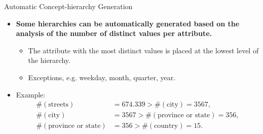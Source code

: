 \begin{frame}{Automatic Concept-hierarchy Generation}
	\begin{itemize}
		\item \textbf{Some hierarchies can be automatically generated based on
			      the analysis of the number of distinct values per attribute.}
		      \begin{itemize}
			      \item The attribute with the most distinct values is placed at the
			            lowest level of the hierarchy.
			      \item Exceptions, e.g. weekday, month, quarter, year.
		      \end{itemize}
		\item Example:
		      \begin{align}
			      \#(\text{streets})           & = 674.339 > \#(\text{city}) =
			      3567,                                                         \\
			      \#(\text{city})              & =  3567 > \#(\text{province or
			      state}) =  356,                                               \\
			      \#(\text{province or state}) & =  356 > \#(\text{country}) =
			      15.
		      \end{align}
	\end{itemize}
\end{frame}
